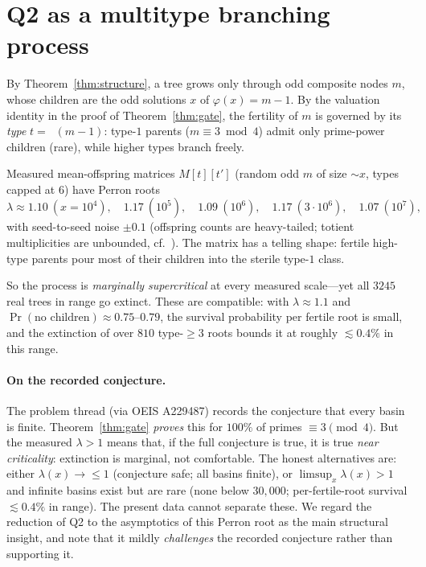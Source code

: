 \documentclass[11pt,a4paper]{article}
\theoremstyle{remark}
\DeclareMathOperator{\vv}{v_2}
\begin{document}
\section{Q2 as a multitype branching process}

By Theorem~\ref{thm:structure}, a tree grows only through odd composite nodes $m$, whose children are the odd solutions $x$ of $\varphi(x)=m-1$. By the valuation identity in the proof of Theorem~\ref{thm:gate}, the fertility of $m$ is governed by its \emph{type} $t=\vv(m-1)$: type-$1$ parents ($m\equiv 3\bmod 4$) admit only prime-power children (rare), while higher types branch freely.

Measured mean-offspring matrices $M[t][t']$ (random odd $m$ of size $\sim x$, types capped at $6$) have Perron roots
\[
\lambda\approx 1.10\ (x=10^4),\quad 1.17\ (10^5),\quad 1.09\ (10^6),\quad 1.17\ (3\cdot 10^6),\quad 1.07\ (10^7),
\]
with seed-to-seed noise $\pm 0.1$ (offspring counts are heavy-tailed; totient multiplicities are unbounded, cf.~\cite{Ford}). The matrix has a telling shape: fertile high-type parents pour most of their children into the sterile type-$1$ class.

So the process is \emph{marginally supercritical} at every measured scale---yet all $3245$ real trees in range go extinct. These are compatible: with $\lambda\approx 1.1$ and $\Pr(\text{no children})\approx 0.75$--$0.79$, the survival probability per fertile root is small, and the extinction of over $810$ type-$\ge 3$ roots bounds it at roughly $\lesssim 0.4\%$ in this range.

\paragraph{On the recorded conjecture.} The problem thread (via OEIS A229487) records the conjecture that every basin is finite. Theorem~\ref{thm:gate} \emph{proves} this for $100\%$ of primes $\equiv 3\pmod 4$. But the measured $\lambda>1$ means that, if the full conjecture is true, it is true \emph{near criticality}: extinction is marginal, not comfortable. The honest alternatives are: either $\lambda(x)\to\le 1$ (conjecture safe; all basins finite), or $\limsup_x\lambda(x)>1$ and infinite basins exist but are rare (none below $30{,}000$; per-fertile-root survival $\lesssim 0.4\%$ in range). The present data cannot separate these. We regard the reduction of Q2 to the asymptotics of this Perron root as the main structural insight, and note that it mildly \emph{challenges} the recorded conjecture rather than supporting it.
\end{document}
